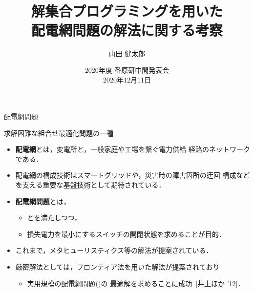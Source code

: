 \documentclass[dvipdfmx,11pt]{beamer}
\title{解集合プログラミングを用いた\\配電網問題の解法に関する考察}
\author[山田 健太郎]{山田 健太郎}
\date{2020年度 番原研中間発表会 \\2020年12月11日}
\institute{番原研究室}
\begin{document}
\begin{frame}{}
  \titlepage
\end{frame}

\begin{frame}{配電網問題}
  \begin{alertblock}{}\centering
    求解困難な組合せ最適化問題の一種
  \end{alertblock}
  \vfill
  \begin{itemize}
  \item \alert{\bf 配電網}とは，変電所と，一般家庭や工場を繋ぐ電力供給
    経路のネットワークである．
  \item  配電網の構成技術はスマートグリッドや，災害時の障害箇所の迂回
    構成などを支える重要な基盤技術として期待されている．
  \item \alert{\bf 配電網問題}とは，
    \begin{itemize}
    \item {}とを満たしつつ，
    \item 損失電力を最小にするスイッチの開閉状態を求めることが目的．
    \end{itemize}
  \item これまで，メタヒューリスティクス等の解法が提案されている．
  \item 厳密解法としては，フロンティア法を用いた解法が提案されており
    \begin{itemize}
    \item 実用規模の配電網問題()の
      最適解を求めることに成功~[井上ほか '12]．
    \end{itemize}
  \end{itemize}
\end{frame}
\end{document}
